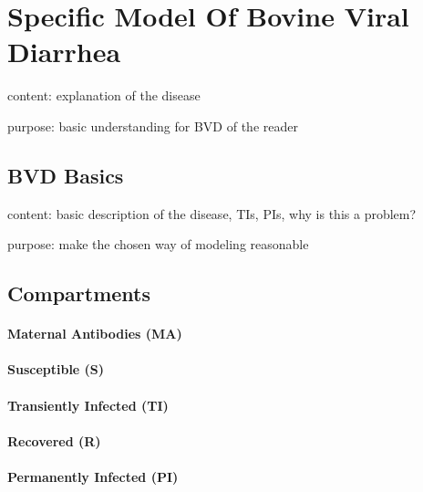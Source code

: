 \section{Specific Model Of Bovine Viral Diarrhea}
\label{chap:bvdModel}
content: explanation of the disease

purpose: basic understanding for BVD of the reader
\subsection{BVD Basics}
content: basic description of the disease, TIs, PIs, why is this a problem?

purpose: make the chosen way of modeling reasonable
\subsection{Compartments}
\paragraph{Maternal Antibodies (MA)}
\paragraph{Susceptible (S)}
\paragraph{Transiently Infected (TI)}
\paragraph{Recovered (R)}
\paragraph{Permanently Infected (PI)}